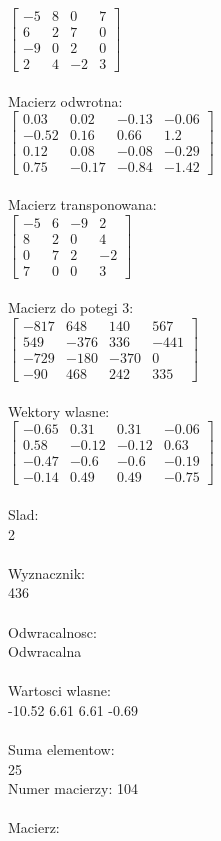 \documentclass[a4paper,12pt]{article}
\begin{document}
$\begin{bmatrix} -5&8&0&7\\6&2&7&0\\-9&0&2&0\\2&4&-2&3 \end{bmatrix}$
\\
\\
Macierz odwrotna:\\

$\begin{bmatrix} 0.03&0.02&-0.13&-0.06\\-0.52&0.16&0.66&1.2\\0.12&0.08&-0.08&-0.29\\0.75&-0.17&-0.84&-1.42 \end{bmatrix}$
\\
\\
Macierz transponowana:\\

$\begin{bmatrix} -5&6&-9&2\\8&2&0&4\\0&7&2&-2\\7&0&0&3 \end{bmatrix}$
\\
\\
Macierz do potegi 3:\\

$\begin{bmatrix} -817&648&140&567\\549&-376&336&-441\\-729&-180&-370&0\\-90&468&242&335 \end{bmatrix}$
\\
\\
Wektory wlasne:\\

$\begin{bmatrix} -0.65&0.31&0.31&-0.06\\0.58&-0.12&-0.12&0.63\\-0.47&-0.6&-0.6&-0.19\\-0.14&0.49&0.49&-0.75 \end{bmatrix}$
\\
\\
Slad:\\
2
\\
\\
Wyznacznik:\\
436
\\
\\
Odwracalnosc:\\
Odwracalna
\\
\\
Wartosci wlasne:\\
-10.52 6.61 6.61 -0.69
\\
\\
Suma elementow:\\
25
\\
\newpage
Numer macierzy:
104
\\
\\
Macierz:\\
\end{document}
